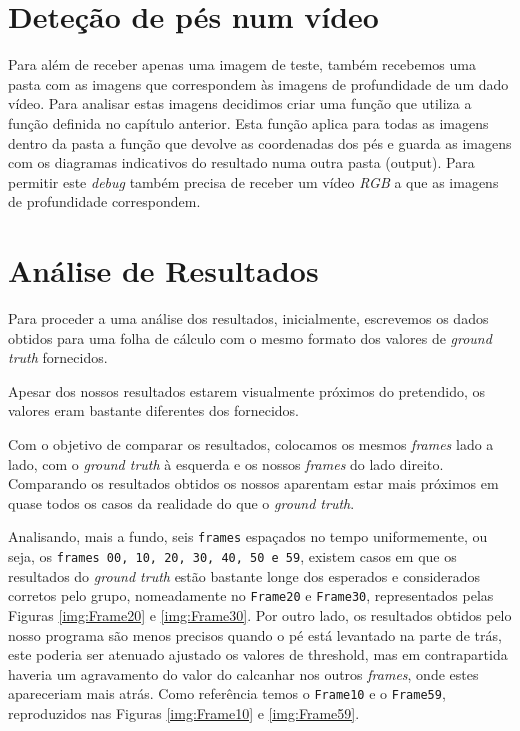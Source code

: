 \documentclass[a4paper]{report}
\begin{document}
\chapter{Deteção de pés num vídeo}
Para além de receber apenas uma imagem de teste, também recebemos uma pasta com as imagens que
correspondem às imagens de profundidade de um dado vídeo. Para analisar estas imagens decidimos
criar uma função que utiliza a função definida no capítulo anterior. Esta função aplica para 
todas as imagens dentro da pasta a função que devolve as coordenadas dos pés
e guarda as imagens com os diagramas indicativos do resultado numa outra pasta (output). Para permitir este
\textit{debug} também precisa de receber um vídeo \textit{RGB} a que as imagens de profundidade
correspondem.

\chapter{Análise de Resultados}

Para proceder a uma análise dos resultados, inicialmente, escrevemos os dados obtidos para
uma folha de cálculo com o mesmo formato dos valores de \textit{ground truth} fornecidos.

Apesar dos nossos resultados estarem visualmente próximos do pretendido, os valores eram
bastante diferentes dos fornecidos.

Com o objetivo de comparar os resultados, colocamos os mesmos \textit{frames} lado a lado, com o \textit{ground
truth} à esquerda e os nossos \textit{frames} do lado direito. Comparando os resultados obtidos os
nossos aparentam estar mais próximos em quase todos os casos da realidade do que o \textit{ground truth}.

Analisando, mais a fundo, seis \texttt{frames} espaçados no tempo uniformemente, ou seja, os  \texttt{frames 00, 10, 20, 30, 40, 50 e 59}, existem casos em que os resultados do \textit{ground truth} estão
bastante longe dos esperados e considerados corretos pelo grupo, nomeadamente no
\texttt{Frame20} e \texttt{Frame30}, representados pelas Figuras \ref{img:Frame20} e
\ref{img:Frame30}.
Por outro lado, os resultados obtidos pelo nosso programa são menos precisos quando
o pé está levantado na parte de trás, este poderia ser atenuado ajustado os valores de threshold, mas em contrapartida haveria um agravamento do valor do calcanhar nos outros \textit{frames}, onde estes apareceriam mais atrás. Como referência temos o \texttt{Frame10} e o
\texttt{Frame59}, reproduzidos nas Figuras \ref{img:Frame10} e \ref{img:Frame59}.
\end{document}
